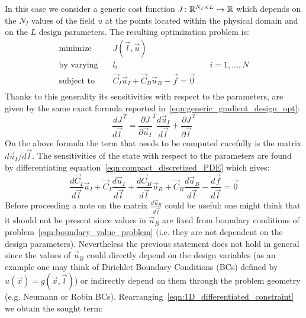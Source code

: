 In this case we consider a generic cost function $J \colon \mathbb{R}^{N_I \times L} \to \mathbb{R}$ which depends on the $N_I$ values of the field $u$ at the points located within the physical domain and on the $L$ design parameters. The resulting optimization problem is:
\begin{equation}
	\label{eqn:design_opt_problem_with_RBF-FD_model_1D}
	\begin{aligned}
		\text{minimize}   & \quad J(\vec{l}, \vec{u})														   \\
		\text{by varying} & \quad l_i  & \quad i=1, \dots, N    \\
		\text{subject to} & \quad \vec{C}_I\vec{u}_I + \vec{C}_B\vec{u}_B - \vec{f} = \vec{0}  \\
	\end{aligned}
\end{equation}
Thanks to this generality its sensitivities with respect to the parameters, are given by the same exact formula reported in~\eqref{eqn:generic_gradient_design_opt}:
\begin{equation}
	\label{eqn:gradient_1st_step_1D_RBF-FD}
	\frac{dJ}{d\vec{l}}^T = \frac{\partial J}{\partial \vec{u}_I}^T \frac{d\vec{u}_I}{d\vec{l}} + \frac{\partial J}{\partial \vec{l}}^T
\end{equation}
On the above formula the term that needs to be computed carefully is the matrix $d\vec{u}_I / d\vec{l}$. The sensitivities of the state with respect to the parameters are found by differentiating equation~\eqref{eqn:compact_discretized_PDE} which gives:
\begin{equation}
	\label{eqn:1D_differentiated_constraint}
	\frac{d\vec{C}_I}{d\vec{l}} \vec{u}_I + \vec{C}_I \frac{d\vec{u}_I}{d\vec{l}} + \frac{d\vec{C}_B}{d\vec{l}} \vec{u}_B + \vec{C}_B \frac{d\vec{u}_B}{d\vec{l}} -
	\frac{d\vec{f}}{d\vec{l}} = \vec{0}
\end{equation}
Before proceeding a note on the matrix $\frac{d\vec{u}_B}{d\vec{l}}$ could be useful: one might think that it should not be present since values in $\vec{u}_B$ are fixed from boundary conditions of problem~\eqref{eqn:boundary_value_problem} (i.e. they are not dependent on the design parameters).
Nevertheless the previous statement does not hold in general since the values of $\vec{u}_B$ could directly depend on the design variables (as an example one may think of Dirichlet Boundary Conditions (BCs) defined by $u(\vec{x})=g(\vec{x}, \vec{l})$) or indirectly depend on them through the problem geometry (e.g. Neumann or Robin BCs). Rearranging~\eqref{eqn:1D_differentiated_constraint} we obtain the sought term:
